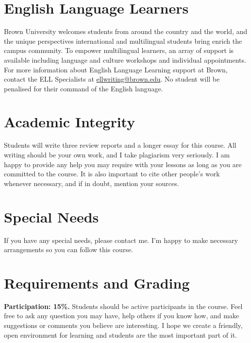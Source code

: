 \documentclass[12pt,]{article}
\begin{document}
\hypertarget{english-language-learners}{%
\section{English Language Learners}\label{english-language-learners}}

Brown University welcomes students from around the country and the
world, and the unique perspectives international and multilingual
students bring enrich the campus community. To empower multilingual
learners, an array of support is available including language and
culture workshops and individual appointments. For more information
about English Language Learning support at Brown, contact the ELL
Specialists at \url{ellwriting@brown.edu}. No student will be penalised
for their command of the English language.

\hypertarget{academic-integrity}{%
\section{Academic Integrity}\label{academic-integrity}}

Students will write three review reports and a longer essay for this
course. All writing should be your own work, and I take plagiarism very
seriously. I am happy to provide any help you may require with your
lessons as long as you are committed to the course. It is also important
to cite other people's work whenever necessary, and if in doubt, mention
your sources.

\hypertarget{special-needs}{%
\section{Special Needs}\label{special-needs}}

If you have any special needs, please contact me. I'm happy to make
necessary arrangements so you can follow this course.

\hypertarget{requirements-and-grading}{%
\section{Requirements and Grading}\label{requirements-and-grading}}

\textbf{Participation: 15\%.} Students should be active participants in
the course. Feel free to ask any question you may have, help others if
you know how, and make suggestions or comments you believe are
interesting. I hope we create a friendly, open environment for learning
and students are the most important part of it.
\end{document}
